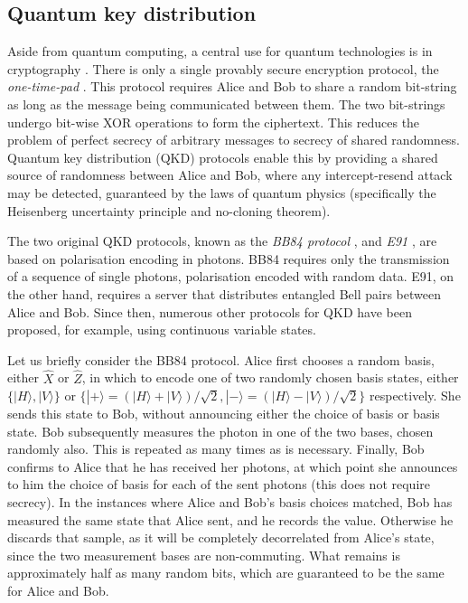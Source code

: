 \documentclass[aps,rmp,twocolumn,amsmath,amssymb,nofootinbib,superscriptaddress,longbibliography,floatfix]{revtex4-1}
\newcommand{\ket}[1]{|#1\rangle}
\begin{document}
%
%

\subsection{Quantum key distribution} \label{sec:QKD}

Aside from quantum computing, a central use for quantum technologies is in cryptography \cite{bib:Gisin02}. There is only a single provably secure encryption protocol, the \emph{one-time-pad} \cite{bib:Schneier96}. This protocol requires Alice and Bob to share a random bit-string as long as the message being communicated between them. The two bit-strings undergo bit-wise XOR operations to form the ciphertext. This reduces the problem of perfect secrecy of arbitrary messages to secrecy of shared randomness. Quantum key distribution (QKD) protocols enable this by providing a shared source of randomness between Alice and Bob, where any intercept-resend attack may be detected, guaranteed by the laws of quantum physics (specifically the Heisenberg uncertainty principle and no-cloning theorem).

The two original QKD protocols, known as the \emph{BB84 protocol} \cite{bib:BennetBrassard84}, and \emph{E91} \cite{bib:Ekert91}, are based on polarisation encoding in photons. BB84 requires only the transmission of a sequence of single photons, polarisation encoded with random data. E91, on the other hand, requires a server that distributes entangled Bell pairs between Alice and Bob. Since then, numerous other protocols for QKD have been proposed, for example, using continuous variable states.

Let us briefly consider the BB84 protocol. Alice first chooses a random basis, either $\hat{X}$ or $\hat{Z}$, in which to encode one of two randomly chosen basis states, either \mbox{$\{\ket{H},\ket{V}\}$} or \mbox{$\{\ket{+}=(\ket{H}+\ket{V})/\sqrt{2},\ket{-}=(\ket{H}-\ket{V})/\sqrt{2}\}$} respectively. She sends this state to Bob, without announcing either the choice of basis or basis state. Bob subsequently measures the photon in one of the two bases, chosen randomly also. This is repeated as many times as is necessary. Finally, Bob confirms to Alice that he has received her photons, at which point she announces to him the choice of basis for each of the sent photons (this does not require secrecy). In the instances where Alice and Bob's basis choices matched, Bob has measured the same state that Alice sent, and he records the value. Otherwise he discards that sample, as it will be completely decorrelated from Alice's state, since the two measurement bases are non-commuting. What remains is approximately half as many random bits, which are guaranteed to be the same for Alice and Bob.
\end{document}
